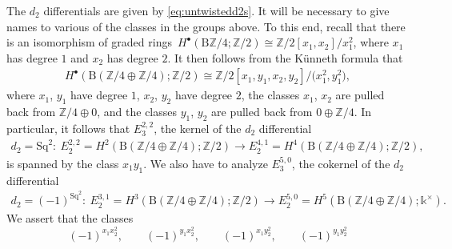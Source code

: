 \documentclass[pdftex]{sigma}
\numberwithin{equation}{section}
\begin{document}
The $d_2$ differentials are given by \eqref{eq:untwistedd2s}. It will be necessary to give names to various of the classes in the groups above. To this end, recall that there is an isomorphism of graded rings~$H^{\bullet}(\mathrm{B}\mathbb{Z}/4;\mathbb{Z}/2)\cong \mathbb{Z}/2[x_1,x_2]/x_1^2$, where $x_1$ has degree $1$ and $x_2$ has degree $2$. It then follows from the K\"unneth formula that
\begin{gather*}
H^{\bullet}(\mathrm{B}(\mathbb{Z}/4\oplus\mathbb{Z}/4);\mathbb{Z}/2)\cong \mathbb{Z}/2[x_1,y_1,x_2,y_2]/\big(x_1^2,y_1^2\big),
\end{gather*}
 where $x_1$, $y_1$ have degree $1$, $x_2$, $y_2$ have degree $2$, the classes $x_1$, $x_2$ are pulled back from $\mathbb{Z}/4\oplus 0$, and the classes $y_1$, $y_2$ are pulled back from $0\oplus \mathbb{Z}/4$. In particular, it follows that $E_3^{2,2}$, the kernel of the $d_2$ differential
 \begin{gather*}
 d_2=\mathrm{Sq}^2\colon\ E^{2,2}_2=H^2(\mathrm{B}(\mathbb{Z}/4\oplus\mathbb{Z}/4);\mathbb{Z}/2)\rightarrow E^{4,1}_2=H^4(\mathrm{B}(\mathbb{Z}/4\oplus\mathbb{Z}/4);\mathbb{Z}/2),
 \end{gather*}
 is spanned by the class $x_1y_1$. We also have to analyze $E_3^{5,0}$, the cokernel of the $d_2$ differential
 \begin{gather*}
 d_2=(-1)^{\mathrm{Sq}^2}\colon\ E^{3,1}_2=H^3(\mathrm{B}(\mathbb{Z}/4\oplus\mathbb{Z}/4);\mathbb{Z}/2)\rightarrow E^{5,0}_2=H^5(\mathrm{B}(\mathbb{Z}/4\oplus\mathbb{Z}/4);\mathds{k}^{\times}).
 \end{gather*}
 We assert that the classes
 \begin{equation}\label{eqn:2torsionclasses}
 (-1)^{x_1x_2^2},\qquad (-1)^{y_1x_2^2},\qquad (-1)^{x_1y_2^2},\qquad (-1)^{y_1y_2^2}
 \end{equation}
\end{document}
